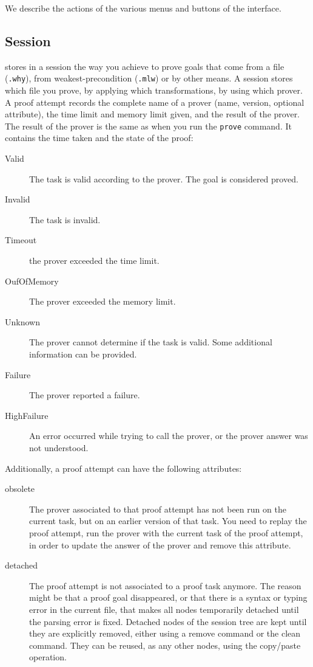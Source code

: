 We describe the actions of the various menus and buttons of the
interface.

\subsection{Session}
\label{sec:idref:session}
\why stores in a session the way you achieve to prove goals that come
from a file (\texttt{.why}), from weakest-precondition (\texttt{.mlw}) or by other
means. A session stores which file you prove, by applying which
transformations, by using which prover. A proof attempt records the
complete name of a prover (name, version, optional attribute), the
time limit and memory limit given, and the result of the prover. The
result of the prover is the same as when you run the \texttt{prove} command. It
contains the time taken and the state of the proof:

\begin{description}
\item[Valid] The task is valid according to the prover. The
  goal is considered proved.
\item[Invalid] The task is invalid.
\item[Timeout] the prover exceeded the time limit.
\item[OufOfMemory] The prover exceeded the memory limit.
\item[Unknown] The prover cannot determine if the task
  is valid. Some additional information can be provided.
\item[Failure] The prover reported a failure.
\item[HighFailure] An error occurred while trying to call the
  prover, or the prover answer was not understood.
\end{description}

Additionally, a proof attempt can have the following attributes:

\begin{description}
\item[obsolete] The prover associated to
  that proof attempt has not been run on the current task, but on an
  earlier version of that task. You need to replay the proof
  attempt, \ie run the prover with the current task of the proof
  attempt, in order to update the answer of the prover and remove this
  attribute.
\item[detached] The proof attempt is not
  associated to a proof task anymore. The reason might be that a proof
  goal disappeared, or that there is a syntax or typing error in the
  current file, that makes all nodes temporarily detached until the
  parsing error is fixed. Detached nodes of the session tree are kept
  until they are explicitly removed, either using a remove command or
  the clean command. They can be reused, as any other nodes, using the
  copy/paste operation.
\end{description}

